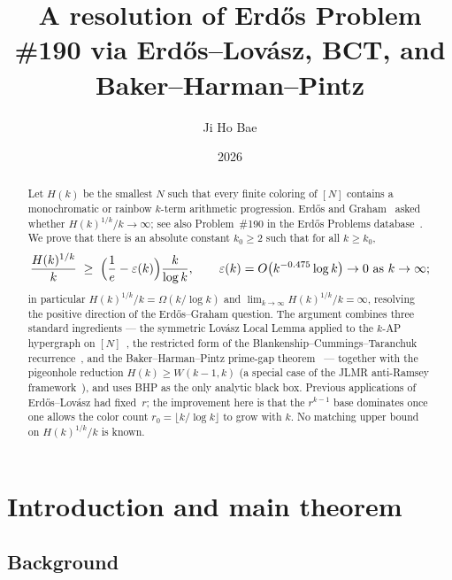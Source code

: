 \documentclass[11pt,reqno,a4paper]{amsart}
\title[Erd\H{o}s Problem \#190]{A resolution of
Erd\H{o}s Problem \#190 via Erd\H{o}s--Lov\'asz, BCT, and Baker--Harman--Pintz}
\author{Ji Ho Bae}
\date{2026}
\theoremstyle{plain}
\theoremstyle{definition}
\theoremstyle{remark}
\numberwithin{equation}{section}
\begin{document}
\begin{abstract}
Let $H(k)$ be the smallest $N$ such that every finite coloring of
$[N]$ contains a monochromatic or rainbow $k$-term arithmetic
progression. Erd\H{o}s and Graham~\cite{ErdosGraham1980} asked
whether $H(k)^{1/k}/k\to\infty$; see also Problem~\#190 in the
Erd\H{o}s Problems database~\cite{Bloom2023}. We prove that there
is an absolute constant $k_{0}\ge 2$ such that for all $k\ge k_{0}$,
\[
\frac{H(k)^{1/k}}{k}\;\ge\;\Bigl(\frac{1}{e}-\varepsilon(k)\Bigr)\frac{k}{\log k},
\qquad
\varepsilon(k)=O\bigl(k^{-0.475}\log k\bigr)\to 0\text{ as }k\to\infty;
\]
in particular $H(k)^{1/k}/k=\Omega(k/\log k)$ and
$\lim_{k\to\infty}H(k)^{1/k}/k=\infty$, resolving the positive
direction of the Erd\H{o}s--Graham question. The argument combines
three standard ingredients --- the symmetric Lov\'asz Local Lemma
applied to the $k$-AP hypergraph on
$[N]$~\cite{ErdosLovasz1975,AlonSpencer2016}, the restricted form of
the Blankenship--Cummings--Taranchuk
recurrence~\cite{BCT}, and the Baker--Harman--Pintz prime-gap
theorem~\cite{BHP} --- together with the pigeonhole reduction
$H(k)\ge W(k-1,k)$ (a special case of the JLMR anti-Ramsey
framework~\cite{JLMR,BEHH2016}), and uses BHP as the only analytic
black box. Previous applications of Erd\H{o}s--Lov\'asz had
fixed~$r$; the improvement here is that the $r^{k-1}$ base dominates
once one allows the color count $r_0=\lfloor k/\log k\rfloor$ to grow
with $k$. No matching upper bound on $H(k)^{1/k}/k$ is known.
\end{abstract}

\maketitle

\section{Introduction and main theorem}
\label{sec:intro}

\subsection{Background}
\label{subsec:background}
\end{document}
